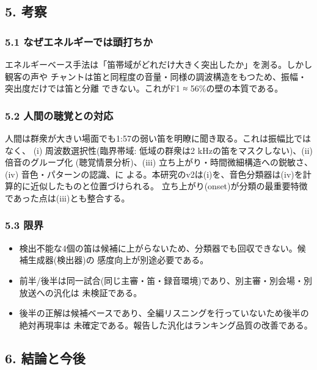 \documentclass[
  japanese,
]{ltjsarticle}
\providecommand{\tightlist}{%
  \setlength{\itemsep}{0pt}\setlength{\parskip}{0pt}}
\begin{document}
\subsection{5. 考察}\label{ux8003ux5bdf}

\subsubsection{5.1
なぜエネルギーでは頭打ちか}\label{ux306aux305cux30a8ux30cdux30ebux30aeux30fcux3067ux306fux982dux6253ux3061ux304b}

エネルギーベース手法は「笛帯域がどれだけ大きく突出したか」を測る。しかし観客の声や
チャントは笛と同程度の音量・同様の調波構造をもつため、振幅・突出度だけでは笛と分離
できない。これがF1 ≈ 56\%の壁の本質である。

\subsubsection{5.2
人間の聴覚との対応}\label{ux4ebaux9593ux306eux8074ux899aux3068ux306eux5bfeux5fdc}

人間は群衆が大きい場面でも1:57の弱い笛を明瞭に聞き取る。これは振幅比ではなく、
(i) 周波数選択性(臨界帯域: 低域の群衆は2 kHzの笛をマスクしない)、(ii)
倍音のグループ化 (聴覚情景分析)、(iii)
立ち上がり・時間微細構造への鋭敏さ、(iv) 音色・パターンの認識、に
よる。本研究のv2は(i)を、音色分類器は(iv)を計算的に近似したものと位置づけられる。
立ち上がり(onset)が分類の最重要特徴であった点は(iii)とも整合する。

\subsubsection{5.3 限界}\label{ux9650ux754c}

\begin{itemize}
\tightlist
\item
  検出不能な4個の笛は候補に上がらないため、分類器でも回収できない。候補生成器(検出器)の
  感度向上が別途必要である。
\item
  前半/後半は同一試合(同じ主審・笛・録音環境)であり、別主審・別会場・別放送への汎化は
  未検証である。
\item
  後半の正解は候補ベースであり、全編リスニングを行っていないため後半の絶対再現率は
  未確定である。報告した汎化はランキング品質の改善である。
\end{itemize}

\subsection{6. 結論と今後}\label{ux7d50ux8ad6ux3068ux4ecaux5f8c}
\end{document}
